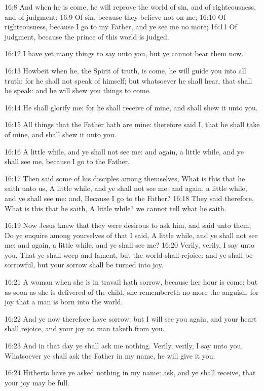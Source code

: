 16:8 And when he is come, he will reprove the world of sin, and of righteousness, and of judgment: 16:9 Of sin, because they believe not on me; 16:10 Of righteousness, because I go to my Father, and ye see me no more; 16:11 Of judgment, because the prince of this world is judged.

16:12 I have yet many things to say unto you, but ye cannot bear them now.

16:13 Howbeit when he, the Spirit of truth, is come, he will guide you into all truth: for he shall not speak of himself; but whatsoever he shall hear, that shall he speak: and he will shew you things to come.

16:14 He shall glorify me: for he shall receive of mine, and shall shew it unto you.

16:15 All things that the Father hath are mine: therefore said I, that he shall take of mine, and shall shew it unto you.

16:16 A little while, and ye shall not see me: and again, a little while, and ye shall see me, because I go to the Father.

16:17 Then said some of his disciples among themselves, What is this that he saith unto us, A little while, and ye shall not see me: and again, a little while, and ye shall see me: and, Because I go to the Father?  16:18 They said therefore, What is this that he saith, A little while? we cannot tell what he saith.

16:19 Now Jesus knew that they were desirous to ask him, and said unto them, Do ye enquire among yourselves of that I said, A little while, and ye shall not see me: and again, a little while, and ye shall see me?  16:20 Verily, verily, I say unto you, That ye shall weep and lament, but the world shall rejoice: and ye shall be sorrowful, but your sorrow shall be turned into joy.

16:21 A woman when she is in travail hath sorrow, because her hour is come: but as soon as she is delivered of the child, she remembereth no more the anguish, for joy that a man is born into the world.

16:22 And ye now therefore have sorrow: but I will see you again, and your heart shall rejoice, and your joy no man taketh from you.

16:23 And in that day ye shall ask me nothing. Verily, verily, I say unto you, Whatsoever ye shall ask the Father in my name, he will give it you.

16:24 Hitherto have ye asked nothing in my name: ask, and ye shall receive, that your joy may be full.

